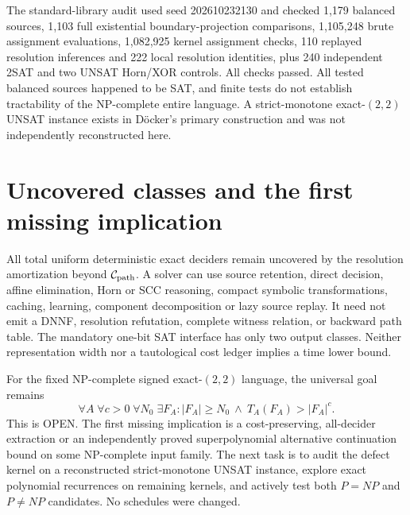 \documentclass[11pt]{article}
\begin{document}
The standard-library audit used seed 202610232130 and checked 1,179 balanced sources, 1,103 full existential boundary-projection comparisons, 1,105,248 brute assignment evaluations, 1,082,925 kernel assignment checks, 110 replayed resolution inferences and 222 local resolution identities, plus 240 independent 2SAT and two UNSAT Horn/XOR controls. All checks passed. All tested balanced sources happened to be SAT, and finite tests do not establish tractability of the NP-complete entire language. A strict-monotone exact-$(2,2)$ UNSAT instance exists in D\"ocker's primary construction and was not independently reconstructed here.

\section{Uncovered classes and the first missing implication}
All total uniform deterministic exact deciders remain uncovered by the resolution amortization beyond $\mathcal C_{\rm path}$. A solver can use source retention, direct decision, affine elimination, Horn or SCC reasoning, compact symbolic transformations, caching, learning, component decomposition or lazy source replay. It need not emit a DNNF, resolution refutation, complete witness relation, or backward path table. The mandatory one-bit SAT interface has only two output classes. Neither representation width nor a tautological cost ledger implies a time lower bound.

For the fixed NP-complete signed exact-$(2,2)$ language, the universal goal remains
\[
\forall A\;\forall c>0\;\forall N_0\;\exists F_A:
|F_A|\ge N_0\ \land\ T_A(F_A)>|F_A|^c.
\]
This is OPEN. The first missing implication is a cost-preserving, all-decider extraction or an independently proved superpolynomial alternative continuation bound on some NP-complete input family. The next task is to audit the defect kernel on a reconstructed strict-monotone UNSAT instance, explore exact polynomial recurrences on remaining kernels, and actively test both $P=NP$ and $P\ne NP$ candidates. No schedules were changed.
\end{document}
